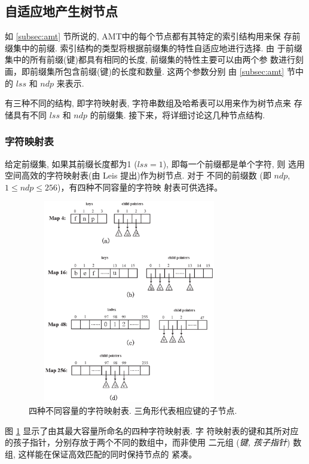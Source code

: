 \subsection{自适应地产生树节点}
\label{subsec:nodes}

如 \ref{subsec:amt} 节所说的, AMT中的每个节点都有其特定的索引结构用来保
存前缀集中的前缀. 索引结构的类型将根据前缀集的特性自适应地进行选择. 由
于前缀集中的所有前缀(键)都具有相同的长度, 前缀集的特性主要可以由两个参
数进行刻画，即前缀集所包含前缀(键)的长度和数量. 这两个参数分别
由 \ref{subsec:amt} 节中的 $lss$ 和 $ndp$ 来表示.

有三种不同的结构, 即字符映射表, 字符串数组及哈希表可以用来作为树节点来
存储具有不同 $lss$ 和 $ndp$ 的前缀集. 接下来，将详细讨论这几种节点结构.

\noindent\subsubsection{字符映射表}

给定前缀集, 如果其前缀长度都为1 ($lss=1$), 即每一个前缀都是单个字符, 则
选用空间高效的字符映射表(由 Leis \cite{Leis2013} 提出)作为树节点. 对于
不同的前缀数 (即 $ndp$, $1 \leq ndp \leq 256$)，有四种不同容量的字符映
射表可供选择。

\begin{figure}[hp]
  \centering
  \includegraphics[height=3.5in, width=3.5in]{figures/2_MPM/Maps}
  \caption{四种不同容量的字符映射表. 三角形代表相应键的子节点.}
  \label{fig:character map}
\end{figure}

图 \ref{fig:character map} 显示了由其最大容量所命名的四种字符映射表. 字
符映射表的键和其所对应的孩子指针，分别存放于两个不同的数组中，而非使用
二元组 (\emph{键, 孩子指针}) 数组, 这样能在保证高效匹配的同时保持节点的
紧凑。

